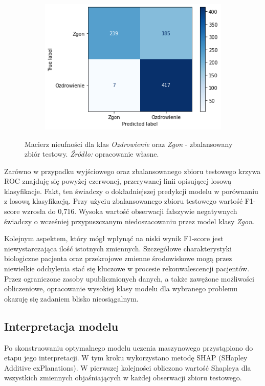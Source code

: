 \documentclass[polish, twoside, 12pt, a4paper]{article}
\theoremstyle{definition}
\theoremstyle{plain}
\theoremstyle{remark}
\begin{document}
\begin{figure}[H]
  \centering
  \begin{subfigure}[t]{\textwidth}
	\centering
    \includegraphics[width=10cm]{conf_matrix_balanced.png}
  \end{subfigure}
  \captionsetup{margin=10pt,font=small,labelfont=bf,width=.8\textwidth}
  \caption{Macierz nieufności dla klas \emph{Ozdrowienie} oraz \emph{Zgon} - zbalansowany zbiór testowy. \textit{Źródło:} opracowanie własne.}
\end{figure}

Zarówno w przypadku wyjściowego oraz zbalansowanego zbioru testowego krzywa ROC znajduję się powyżej czerwonej, przerywanej linii opisującej losową klasyfikacje. Fakt, ten świadczy o dokładniejszej predykcji modelu w porównaniu z losową klasyfikacją. Przy użyciu zbalansowanego zbioru testowego wartość F1-score wzrosła do 0,716. Wysoka wartość obserwacji fałszywie negatywnych świadczy o wcześniej przypuszczanym niedoszacowaniu przez model klasy \emph{Zgon}.

Kolejnym aspektem, który mógł wpłynąć na niski wynik F1-score jest niewystarczająca ilość istotnych zmiennych. Szczegółowe charakterystyki biologiczne pacjenta oraz przekrojowe zmienne środowiskowe mogą przez niewielkie odchylenia stać się kluczowe w procesie rekonwalescencji pacjentów. Przez ograniczone zasoby upublicznionych danych, a także zawężone możliwości obliczeniowe, opracowanie wysokiej klasy modelu dla wybranego problemu okazuję się zadaniem blisko nieosiągalnym.

\subsection{Interpretacja modelu}

Po skonstruowaniu optymalnego modelu uczenia maszynowego przystąpiono do etapu jego interpretacji. W tym kroku wykorzystano metodę SHAP (SHapley Additive exPlanations). W pierwszej kolejności obliczono wartość Shapleya dla wszystkich zmiennych objaśniających w każdej obserwacji zbioru testowego. 
\end{document}
